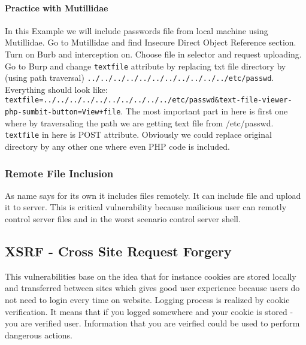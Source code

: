 \paragraph{Practice with Mutillidae}
In this Example we will include passwords file from local machine using Mutillidae.
Go to Mutillidae and find Insecure Direct Object Reference section.
Turn on Burb and interception on.
Choose file in selector and request uploading.
Go to Burp and change \texttt{textfile} attribute by replacing txt file directory by (using path traversal) \texttt{../../../../../../../../../../../etc/passwd}.
Everything should look like: \texttt{textfile=../../../../../../../../../../etc/passwd\&text-file-viewer-php-sumbit-button=View+file}.
The most important part in here is first one where by traversaling the path we are getting text file from /etc/passwd. \texttt{textfile} in here is POST attribute.
Obviously we could replace original directory by any other one where even PHP code is included.

\subsubsection{Remote File Inclusion} As name says for its own it includes files remotely.
It can include file and upload it to server.
This is critical vulnerability because mailicious user can remotly control server files and in the worst scenario control server shell.



\subsection{XSRF - Cross Site Request Forgery}
This vulnerabilities base on the idea that for instance cookies are stored locally and transferred between sites which gives good user experience because users do not need to login every time on website.
Logging process is realized by cookie verification.
It means that if you logged somewhere and your cookie is stored - you are verified user.
Information that you are veirfied could be used to perform dangerous actions.

